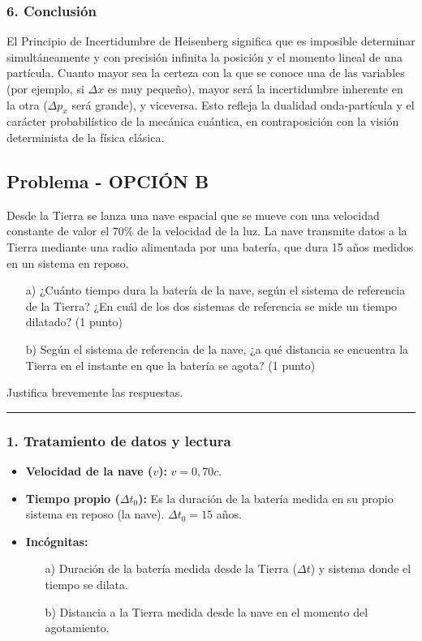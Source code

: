\subsubsection*{6. Conclusión}
\begin{cajaconclusion}
El Principio de Incertidumbre de Heisenberg significa que es imposible determinar simultáneamente y con precisión infinita la posición y el momento lineal de una partícula. Cuanto mayor sea la certeza con la que se conoce una de las variables (por ejemplo, si $\Delta x$ es muy pequeño), mayor será la incertidumbre inherente en la otra ($\Delta p_x$ será grande), y viceversa. Esto refleja la dualidad onda-partícula y el carácter probabilístico de la mecánica cuántica, en contraposición con la visión determinista de la física clásica.
\end{cajaconclusion}

\newpage

\subsection{Problema  - OPCIÓN B}
\label{subsec:5B_2011_sep_ext}

\begin{cajaenunciado}
Desde la Tierra se lanza una nave espacial que se mueve con una velocidad constante de valor el 70\% de la velocidad de la luz. La nave transmite datos a la Tierra mediante una radio alimentada por una batería, que dura 15 años medidos en un sistema en reposo.
\begin{enumerate}
    \item[a)] ¿Cuánto tiempo dura la batería de la nave, según el sistema de referencia de la Tierra? ¿En cuál de los dos sistemas de referencia se mide un tiempo dilatado? (1 punto)
    \item[b)] Según el sistema de referencia de la nave, ¿a qué distancia se encuentra la Tierra en el instante en que la batería se agota? (1 punto)
\end{enumerate}
Justifica brevemente las respuestas.
\end{cajaenunciado}
\hrule

\subsubsection*{1. Tratamiento de datos y lectura}
\begin{itemize}
    \item \textbf{Velocidad de la nave ($v$):} $v = 0,70 c$.
    \item \textbf{Tiempo propio ($\Delta t_0$):} Es la duración de la batería medida en su propio sistema en reposo (la nave). $\Delta t_0 = 15$ años.
    \item \textbf{Incógnitas:}
    \begin{enumerate}
        \item[a)] Duración de la batería medida desde la Tierra ($\Delta t$) y sistema donde el tiempo se dilata.
        \item[b)] Distancia a la Tierra medida desde la nave en el momento del agotamiento.
    \end{enumerate}
\end{itemize}

